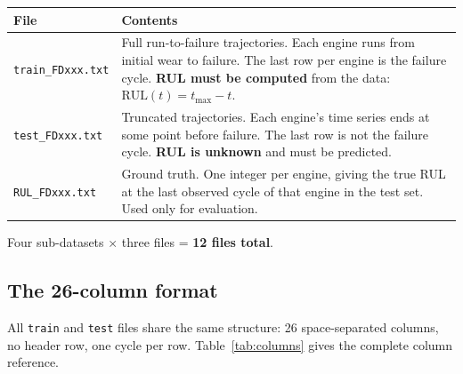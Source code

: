 \documentclass[11pt, a4paper]{article}
\begin{document}
\begin{center}
\begin{tabular}{@{}lp{9.5cm}@{}}
  \toprule
  File & Contents \\
  \midrule
  \texttt{train\_FDxxx.txt} & Full run-to-failure trajectories.
    Each engine runs from initial wear to failure. The last row
    per engine is the failure cycle. \textbf{RUL must be computed}
    from the data: $\text{RUL}(t) = t_\text{max} - t$. \\[4pt]
  \texttt{test\_FDxxx.txt}  & Truncated trajectories. Each engine's
    time series ends at some point before failure. The last row is
    not the failure cycle. \textbf{RUL is unknown} and must be
    predicted. \\[4pt]
  \texttt{RUL\_FDxxx.txt}   & Ground truth. One integer per engine,
    giving the true RUL at the last observed cycle of that engine
    in the test set. Used only for evaluation. \\
  \bottomrule
\end{tabular}
\end{center}

Four sub-datasets $\times$ three files = \textbf{12 files total}.

\subsection{The 26-column format}

All \texttt{train} and \texttt{test} files share the same structure:
26 space-separated columns, no header row, one cycle per row.
Table~\ref{tab:columns} gives the complete column reference.
\end{document}
